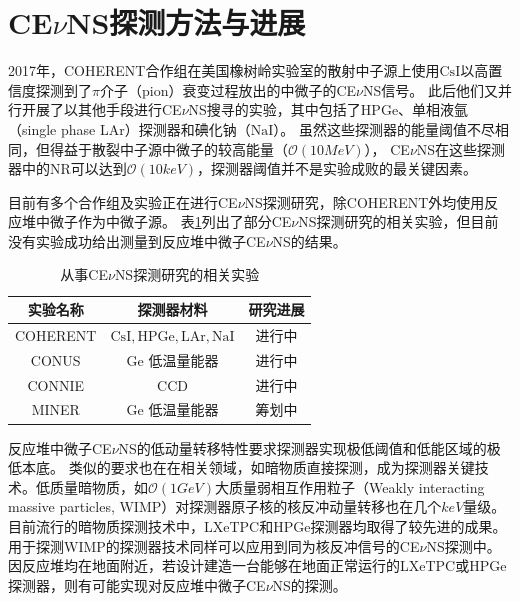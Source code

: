 \section{CE$\nu$NS探测方法与进展}

2017年，COHERENT合作组在美国橡树岭实验室的散射中子源上使用$\mathrm{CsI}$以高置信度探测到了$\pi$介子（pion）衰变过程放出的中微子的CE$\nu$NS信号\cite{akimov_observation_2017}。
此后他们又并行开展了以其他手段进行CE$\nu$NS搜寻的实验，其中包括了HPGe、单相液氩（single phase LAr）探测器和碘化钠（$\mathrm{NaI}$）。
虽然这些探测器的能量阈值不尽相同，但得益于散裂中子源中微子的较高能量（$\mathcal{O}\left(10\si{MeV}\right)$），
CE$\nu$NS在这些探测器中的NR可以达到$\mathcal{O}\left(10\si{keV}\right)$，探测器阈值并不是实验成败的最关键因素。

目前有多个合作组及实验正在进行CE$\nu$NS探测研究，除COHERENT外均使用反应堆中微子作为中微子源。
表\ref{tab:experiments}列出了部分CE$\nu$NS探测研究的相关实验，但目前没有实验成功给出测量到反应堆中微子CE$\nu$NS的结果。

\begin{table}
  \centering
  \caption{从事CE$\nu$NS探测研究的相关实验}
  \begin{tabular}{ccc}
    \toprule
    实验名称 & 探测器材料 & 研究进展 \\
    \midrule
    COHERENT & $\mathrm{CsI,HPGe,LAr,NaI}$ & 进行中\cite{coherent_collaboration_monitoring_2022} \\
    CONUS & $\mathrm{Ge}$ 低温量能器 & 进行中\cite{conus_collaboration_novel_2021} \\
    CONNIE & $\mathrm{CCD}$ & 进行中\cite{connie_collaboration_search_2022} \\
    MINER & $\mathrm{Ge}$ 低温量能器 & 筹划中\cite{agnolet_background_2017} \\
    \bottomrule
  \end{tabular}
  \label{tab:experiments}
\end{table}

反应堆中微子CE$\nu$NS的低动量转移特性要求探测器实现极低阈值和低能区域的极低本底。
类似的要求也在在相关领域，如暗物质直接探测，成为探测器关键技术。低质量暗物质，如$\mathcal{O}\left(1\si{GeV}\right)$大质量弱相互作用粒子（Weakly interacting massive particles, WIMP）对探测器原子核的核反冲动量转移也在几个$\si{keV}$量级。
目前流行的暗物质探测技术中，LXeTPC和HPGe探测器均取得了较先进的成果。用于探测WIMP的探测器技术同样可以应用到同为核反冲信号的CE$\nu$NS探测中。
因反应堆均在地面附近，若设计建造一台能够在地面正常运行的LXeTPC或HPGe探测器，则有可能实现对反应堆中微子CE$\nu$NS的探测。
